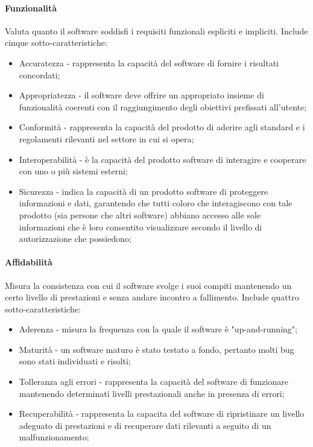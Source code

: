 \documentclass[10pt]{article}
\begin{document}
\begin{justify}
            \paragraph{Funzionalità}
            Valuta quanto il software soddisfi i requisiti funzionali espliciti e impliciti. Include cinque sotto-caratteristiche:
            \begin{itemize}
                \item Accuratezza - rappresenta la capacità del software di fornire i risultati concordati;
                \item Appropriatezza - il software deve offrire un appropriato insieme di funzionalità coerenti con il raggiungimento degli obiettivi prefissati all'utente;
                \item Conformità - rappresenta la capacità del prodotto di aderire agli standard e i regolamenti rilevanti nel settore in cui si opera;
                \item Interoperabilità - è la capacità del prodotto software di interagire e cooperare con uno o più sistemi esterni;
                \item Sicurezza - indica la capacità di un prodotto software di proteggere informazioni e dati, garantendo che tutti coloro che interagiscono con tale prodotto (sia persone che altri
                software) abbiano accesso alle sole informazioni che è loro consentito visualizzare secondo il livello di autorizzazione che possiedono;
            \end{itemize}

            \paragraph{Affidabilità}
            Misura la consistenza con cui il software svolge i suoi compiti mantenendo un certo livello di prestazioni e senza andare incontro a fallimento. Include quattro sotto-caratteristiche:
            \begin{itemize}
                \item Aderenza - misura la frequenza con la quale il software è "up-and-running";
                \item Maturità - un software maturo è stato testato a fondo, pertanto molti bug sono stati individuati e risolti;
                \item Tolleranza agli errori - rappresenta la capacità del software di funzionare mantenendo determinati livelli prestazionali anche in presenza di errori;
                \item Recuperabilità - rappresenta la capacita del software di ripristinare un livello adeguato di prestazioni e di recuperare dati rilevanti a seguito di un malfunzionamento;
            \end{itemize}


\end{justify}
\end{document}
